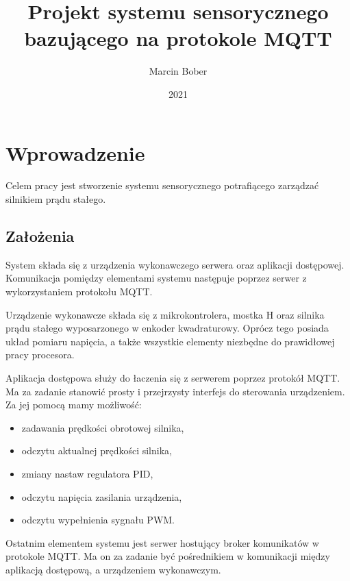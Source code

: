 \documentclass[eng, 11pt, twoside, openany]{mgr}
\author{Marcin Bober}
\title{Projekt systemu sensorycznego bazującego na protokole MQTT}
\date{2021}
\begin{document}
  
  \maketitle
  \tableofcontents
  
  \chapter{Wprowadzenie}
  
    Celem pracy jest stworzenie systemu sensorycznego 
    potrafiącego zarządzać silnikiem prądu stałego.

  

    \section{Założenia}

      System składa się z urządzenia wykonawczego serwera 
      oraz aplikacji dostępowej. 
      Komunikacja pomiędzy elementami systemu 
      następuje poprzez serwer z wykorzystaniem protokołu MQTT.
      
      Urządzenie wykonawcze składa się z mikrokontrolera,
      mostka H oraz silnika prądu stałego wyposarzonego w enkoder
      kwadraturowy. Oprócz tego posiada układ pomiaru napięcia, a
      także wszystkie elementy niezbędne do prawidłowej pracy 
      procesora.

      Aplikacja dostępowa służy do łaczenia się z serwerem 
      poprzez protokół MQTT. Ma za zadanie stanowić prosty i 
      przejrzysty interfejs do sterowania urządzeniem.
      Za jej pomocą mamy możliwość:
  
      \begin{itemize}
        \item zadawania prędkości obrotowej silnika,
        \item odczytu aktualnej prędkości silnika,
        \item zmiany nastaw regulatora PID,
        \item odczytu napięcia zasilania urządzenia,
        \item odczytu wypełnienia sygnału PWM.
      \end{itemize}
  
      Ostatnim elementem systemu jest serwer hostujący broker
      komunikatów w protokole MQTT. Ma on za zadanie być
      pośrednikiem w komunikacji między aplikacją dostępową,
      a urządzeniem wykonawczym.
\end{document}
